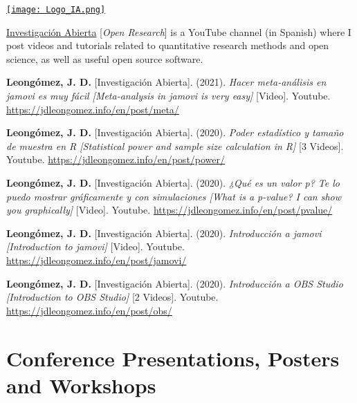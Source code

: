 \documentclass[11pt,a4paper,]{awesome-cv}
\begin{document}
\begin{minipage}[c]{0.15\linewidth}
\href{https://www.youtube.com/@InvestigacionAbierta}{\texttt{[image: Logo\_IA.png]}}
\end{minipage} \begin{minipage}[c]{0.85\linewidth}
\textcolor{red}{\faYoutubePlay} \href{https://www.youtube.com/@InvestigacionAbierta}{Investigación Abierta} [\textit{Open Research}] is a YouTube channel (in Spanish) where I post videos and tutorials related to quantitative research methods and open science, as well as useful open source software.
\end{minipage}

\begingroup
\setlength{\parindent}{-0.5in}
\setlength{\leftskip}{0.5in}

\textbf{Leongómez, J. D.} {[}Investigación Abierta{]}. (2021).
\emph{Hacer meta-análisis en jamovi es muy fácil {[}Meta-analysis in
jamovi is very easy{]}} {[}Video{]}. Youtube.
\url{https://jdleongomez.info/en/post/meta/}

\textbf{Leongómez, J. D.} {[}Investigación Abierta{]}. (2020).
\emph{Poder estadístico y tamaño de muestra en R {[}Statistical power
and sample size calculation in R{]}} {[}3 Videos{]}. Youtube.
\url{https://jdleongomez.info/en/post/power/}

\textbf{Leongómez, J. D.} {[}Investigación Abierta{]}. (2020).
\emph{¿Qué es un valor p? Te lo puedo mostrar gráficamente y con
simulaciones {[}What is a p-value? I can show you graphically{]}}
{[}Video{]}. Youtube. \url{https://jdleongomez.info/en/post/pvalue/}

\textbf{Leongómez, J. D.} {[}Investigación Abierta{]}. (2020).
\emph{Introducción a jamovi {[}Introduction to jamovi{]}} {[}Video{]}.
Youtube. \url{https://jdleongomez.info/en/post/jamovi/}

\textbf{Leongómez, J. D.} {[}Investigación Abierta{]}. (2020).
\emph{Introducción a OBS Studio {[}Introduction to OBS Studio{]}} {[}2
Videos{]}. Youtube. \url{https://jdleongomez.info/en/post/obs/}

\endgroup

\hypertarget{conference-presentations-posters-and-workshops}{%
\section{Conference Presentations, Posters and
Workshops}\label{conference-presentations-posters-and-workshops}}

\begingroup
\setlength{\parindent}{-0.5in}
\setlength{\leftskip}{0.5in}
\end{document}
